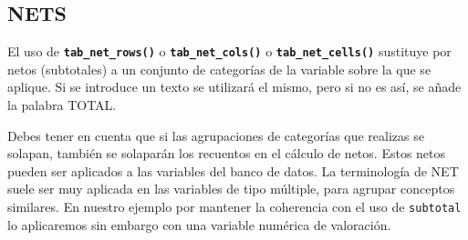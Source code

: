 \documentclass[
]{book}
\begin{document}
\hypertarget{nets}{%
\subsection{NETS}\label{nets}}

El uso de \textbf{\texttt{tab\_net\_rows()}} o \textbf{\texttt{tab\_net\_cols()}} o \textbf{\texttt{tab\_net\_cells()}} sustituye por netos (subtotales) a un conjunto de categorías de la variable sobre la que se aplique. Si se introduce un texto se utilizará el mismo, pero si no es así, se añade la palabra TOTAL.

Debes tener en cuenta que si las agrupaciones de categorías que realizas se solapan, también se solaparán los recuentos en el cálculo de netos. Estos netos pueden ser aplicados a las variables del banco de datos. La terminología de NET suele ser muy aplicada en las variables de tipo múltiple, para agrupar conceptos similares. En nuestro ejemplo por mantener la coherencia con el uso de \texttt{subtotal} lo aplicaremos sin embargo con una variable numérica de valoración.
\end{document}
